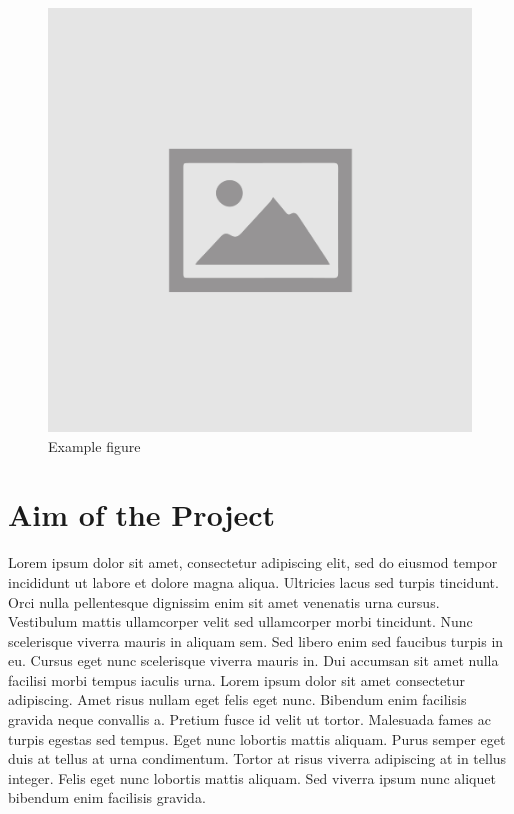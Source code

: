 \begin{figure}
	\includegraphics[width=\linewidth]{pictures/placeholder.png}
	\caption{Example figure}
	\label{fig:dwi}
\end{figure}

\section{Aim of the Project}
Lorem ipsum dolor sit amet, consectetur adipiscing elit, sed do eiusmod tempor incididunt ut labore et dolore magna aliqua. Ultricies lacus sed turpis tincidunt. Orci nulla pellentesque dignissim enim sit amet venenatis urna cursus. Vestibulum mattis ullamcorper velit sed ullamcorper morbi tincidunt. Nunc scelerisque viverra mauris in aliquam sem. Sed libero enim sed faucibus turpis in eu. Cursus eget nunc scelerisque viverra mauris in. Dui accumsan sit amet nulla facilisi morbi tempus iaculis urna. Lorem ipsum dolor sit amet consectetur adipiscing. Amet risus nullam eget felis eget nunc. Bibendum enim facilisis gravida neque convallis a. Pretium fusce id velit ut tortor. Malesuada fames ac turpis egestas sed tempus. Eget nunc lobortis mattis aliquam. Purus semper eget duis at tellus at urna condimentum. Tortor at risus viverra adipiscing at in tellus integer. Felis eget nunc lobortis mattis aliquam. Sed viverra ipsum nunc aliquet bibendum enim facilisis gravida.

